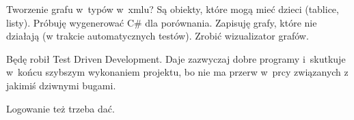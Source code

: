 Tworzenie grafu w~typów w~xmlu? Są obiekty, które mogą mieć dzieci (tablice, listy). Próbuję wygenerować C\# dla porównania. Zapisuję grafy, które nie działają (w trakcie automatycznych testów). Zrobić wizualizator grafów.

Będę robił Test Driven Development. Daje zazwyczaj dobre programy i~skutkuje w~końcu szybszym wykonaniem projektu, bo nie ma przerw w~prcy związanych z jakimiś dziwnymi bugami.

Logowanie też trzeba dać.



%
%
%
%
%
%
%
%
%
%



